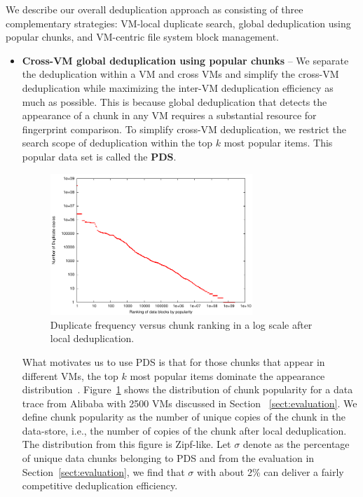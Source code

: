 We describe our overall deduplication approach as consisting of three
complementary strategies: VM-local
duplicate search, global deduplication using popular chunks, and 
VM-centric file system block management. 
\begin{itemize}
\item 
\textbf{Cross-VM global deduplication using popular chunks} --
We separate the deduplication within a VM and cross VMs
and simplify the cross-VM deduplication while maximizing the inter-VM deduplication efficiency  as much as possible.
This is because global deduplication that detects the appearance of a chunk 
in any VM requires a substantial resource for fingerprint comparison.
To simplify cross-VM deduplication, we restrict the search scope of deduplication within the top $k$ 
most popular items. This popular data set is called the \textbf{PDS}. 
 \begin{figure}
 \centering
  \includegraphics[width=3in]{figures/zipf_count_rank.pdf}
 \caption{Duplicate frequency versus  chunk ranking in a log scale after local deduplication.}
 \label{fig:Datazipf}
 \end{figure}


What  motivates us to use PDS
is that for those chunks that appear in different VMs, the top $k$ most popular items
dominate the appearance distribution~\cite{WeiZhangIEEE}.  
Figure~\ref{fig:Datazipf} shows the distribution of chunk popularity for a data trace 
from Alibaba with 2500 VMs discussed in Section ~\ref{sect:evaluation}.
We define chunk popularity as the number of unique copies of the chunk in the data-store,
i.e., the number of copies of the chunk after local deduplication.
The distribution from this figure is Zipf-like. 
Let  $\sigma$ denote as the percentage of unique data chunks belonging to PDS and 
from the evaluation in Section~\ref{sect:evaluation}, we find that
$\sigma$ with about  2\% can deliver a fairly competitive deduplication efficiency.


\end{itemize}
